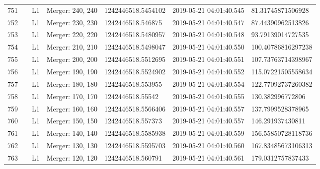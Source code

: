 \begin{longtable}{lllllll}
751  &                                                    &       L1 &  Merger: 240, 240 &  1242446518.5454102 &  2019-05-21 04:01:40.545 &   81.31745871506928 \\
752  &                                                    &       L1 &  Merger: 230, 230 &   1242446518.546875 &  2019-05-21 04:01:40.547 &   87.44390962513826 \\
753  &                                                    &       L1 &  Merger: 220, 220 &  1242446518.5480957 &  2019-05-21 04:01:40.548 &   93.79139014727535 \\
754  &                                                    &       L1 &  Merger: 210, 210 &  1242446518.5498047 &  2019-05-21 04:01:40.550 &  100.40786816297238 \\
755  &                                                    &       L1 &  Merger: 200, 200 &  1242446518.5512695 &  2019-05-21 04:01:40.551 &  107.73763714398967 \\
756  &                                                    &       L1 &  Merger: 190, 190 &  1242446518.5524902 &  2019-05-21 04:01:40.552 &  115.07221505558634 \\
757  &                                                    &       L1 &  Merger: 180, 180 &   1242446518.553955 &  2019-05-21 04:01:40.554 &  122.77092737260382 \\
758  &                                                    &       L1 &  Merger: 170, 170 &    1242446518.55542 &  2019-05-21 04:01:40.555 &    130.382996772806 \\
759  &                                                    &       L1 &  Merger: 160, 160 &  1242446518.5566406 &  2019-05-21 04:01:40.557 &   137.7999528378965 \\
760  &                                                    &       L1 &  Merger: 150, 150 &   1242446518.557373 &  2019-05-21 04:01:40.557 &    146.291937430811 \\
761  &                                                    &       L1 &  Merger: 140, 140 &  1242446518.5585938 &  2019-05-21 04:01:40.559 &  156.55850728118736 \\
762  &                                                    &       L1 &  Merger: 130, 130 &  1242446518.5595703 &  2019-05-21 04:01:40.560 &  167.83485673106313 \\
763  &                                                    &       L1 &  Merger: 120, 120 &   1242446518.560791 &  2019-05-21 04:01:40.561 &   179.0312757837433 \\

\end{longtable}
